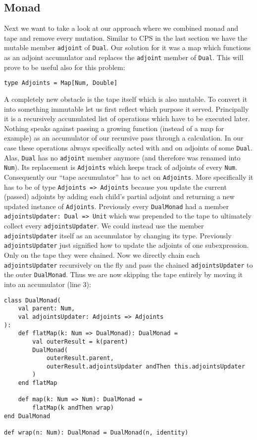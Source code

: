 \subsection{Monad} \label{sec:functionalMonad}

Next we want to take a look at our approach where we combined monad and tape and remove every mutation. Similar to CPS in the last section we have the mutable member \lstinline{adjoint} of \lstinline{Dual}. Our solution for it was a map which functions as an adjoint accumulator and replaces the \lstinline{adjoint} member of \lstinline{Dual}. This will prove to be useful also for this problem:
\begin{lstlisting}
type Adjoints = Map[Num, Double]
\end{lstlisting}

A completely new obstacle is the tape itself which is also mutable. To convert it into something immutable let us first reflect which purpose it served. Principally it is a recursively accumulated list of operations which have to be executed later. Nothing speaks against passing a growing function (instead of a map for example) as an accumulator of our recursive pass through a calculation. In our case these operations always specifically acted with and on adjoints of some \lstinline{Dual}. Alas, \lstinline{Dual} has no \lstinline{adjoint} member anymore (and therefore was renamed into \lstinline{Num}). Its replacement is \lstinline{Adjoints} which keeps track of adjoints of every \lstinline{Num}. Consequently our ``tape accumulator'' has to act on \lstinline{Adjoints}. More specifically it has to be of type \lstinline{Adjoints => Adjoints} because you update the current (passed) adjoints by adding each child's partial adjoint and returning a new updated instance of \lstinline{Adjoints}. Previously every \lstinline{DualMonad} had a member \lstinline{adjointsUpdater: Dual => Unit} which was prepended to the tape to ultimately collect every \lstinline{adjointsUpdater}. We could instead use the member \lstinline{adjointsUpdater} itself as an accumulator by changing its type. Previously \lstinline{adjointsUpdater} just signified how to update the adjoints of one subexpression. Only on the tape they were chained. Now we directly chain each \lstinline{adjointsUpdater} recursively on the fly and pass the chained \lstinline{adjointsUpdater} to the outer \lstinline{DualMonad}. Thus we are now skipping the tape entirely by moving it into an accumulator (line 3):
\begin{lstlisting}
class DualMonad(
    val parent: Num, 
    val adjointsUpdater: Adjoints => Adjoints
):
    def flatMap(k: Num => DualMonad): DualMonad =
        val outerResult = k(parent)
        DualMonad(
            outerResult.parent, 
            outerResult.adjointsUpdater andThen this.adjointsUpdater 
        )
    end flatMap

    def map(k: Num => Num): DualMonad =
        flatMap(k andThen wrap)
end DualMonad

def wrap(n: Num): DualMonad = DualMonad(n, identity)
\end{lstlisting}
